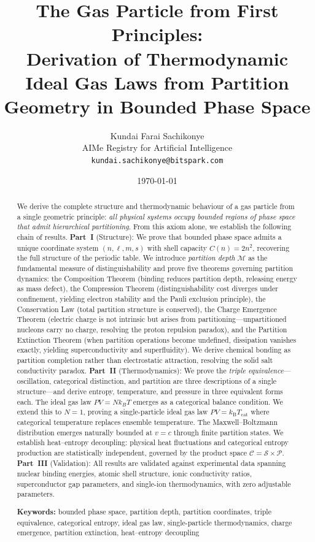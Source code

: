 \documentclass[twocolumn,10pt,a4paper]{article}
\title{\textbf{The Gas Particle from First Principles:\\Derivation of Thermodynamic Ideal Gas Laws from Partition Geometry in Bounded Phase Space}}
\author{
Kundai Farai Sachikonye\\
AIMe Registry for Artificial Intelligence\\
\texttt{kundai.sachikonye@bitspark.com}
}
\date{\today}
\theoremstyle{plain}
\theoremstyle{definition}
\theoremstyle{remark}
\newcommand{\kB}{k_{\mathrm{B}}}
\newcommand{\Depth}{\mathcal{M}}
\newcommand{\Partition}{\mathcal{P}}
\newcommand{\Cat}{\mathcal{C}}
\newcommand{\Sspace}{\mathcal{S}}
\begin{document}
\maketitle

\begin{abstract}
\noindent We derive the complete structure and thermodynamic behaviour of a gas particle from a single geometric principle: \emph{all physical systems occupy bounded regions of phase space that admit hierarchical partitioning}. From this axiom alone, we establish the following chain of results. \textbf{Part~I} (Structure): We prove that bounded phase space admits a unique coordinate system $(n, \ell, m, s)$ with shell capacity $C(n) = 2n^2$, recovering the full structure of the periodic table. We introduce \emph{partition depth} $\Depth$ as the fundamental measure of distinguishability and prove five theorems governing partition dynamics: the Composition Theorem (binding reduces partition depth, releasing energy as mass defect), the Compression Theorem (distinguishability cost diverges under confinement, yielding electron stability and the Pauli exclusion principle), the Conservation Law (total partition structure is conserved), the Charge Emergence Theorem (electric charge is not intrinsic but arises from partitioning---unpartitioned nucleons carry no charge, resolving the proton repulsion paradox), and the Partition Extinction Theorem (when partition operations become undefined, dissipation vanishes exactly, yielding superconductivity and superfluidity). We derive chemical bonding as partition completion rather than electrostatic attraction, resolving the solid salt conductivity paradox. \textbf{Part~II} (Thermodynamics): We prove the \emph{triple equivalence}---oscillation, categorical distinction, and partition are three descriptions of a single structure---and derive entropy, temperature, and pressure in three equivalent forms each. The ideal gas law $PV = Nk_BT$ emerges as a categorical balance condition. We extend this to $N = 1$, proving a single-particle ideal gas law $PV = \kB T_{\mathrm{cat}}$ where categorical temperature replaces ensemble temperature. The Maxwell--Boltzmann distribution emerges naturally bounded at $v = c$ through finite partition states. We establish heat--entropy decoupling: physical heat fluctuations and categorical entropy production are statistically independent, governed by the product space $\Cat = \Sspace \times \Partition$. \textbf{Part~III} (Validation): All results are validated against experimental data spanning nuclear binding energies, atomic shell structure, ionic conductivity ratios, superconductor gap parameters, and single-ion thermodynamics, with zero adjustable parameters.

\medskip
\noindent\textbf{Keywords:} bounded phase space, partition depth, partition coordinates, triple equivalence, categorical entropy, ideal gas law, single-particle thermodynamics, charge emergence, partition extinction, heat--entropy decoupling
\end{abstract}
\end{document}
